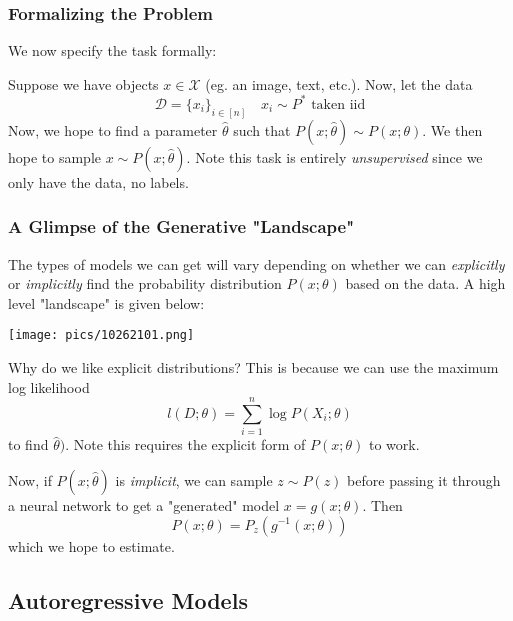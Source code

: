 \documentclass[11pt]{scrartcl}
\begin{document}
\subsubsection{Formalizing the Problem}
We now specify the task formally:

Suppose we have objects $x \in \mathcal{X}$ (eg. an image, text, etc.). Now, let the data $$\mathcal{D}=\{x_i\}_{i \in [n]} \quad x_i \sim P^* \text{ taken iid}$$
Now, we hope to find a parameter $\hat{\theta}$ such that $P(x;\hat{\theta}) \sim P(x;\theta)$. We then hope to sample $x \sim P(x;\hat{\theta})$. Note this task is entirely \textit{unsupervised} since we only have the data, no labels. 

\subsubsection{A Glimpse of the Generative "Landscape"}
The types of models we can get will vary depending on whether we can \textit{explicitly} or \textit{implicitly} find the probability distribution $P(x;\theta)$ based on the data. A high level "landscape" is given below:
\begin{center}
    \texttt{[image: pics/10262101.png]}
\end{center}
Why do we like explicit distributions? This is because we can use the maximum log likelihood $$l(D;\theta) = \sum_{i=1}^{n}\log{P(X_i;\theta)}$$ to find $\hat{\theta})$. Note this requires the explicit form of $P(x;\theta)$ to work. 

Now, if $P(x;\hat{\theta})$ is \textit{implicit}, we can sample $z \sim P(z)$ before passing it through a neural network to get a "generated" model $x = g(x;\theta)$. Then $$P(x;\theta)=P_{z}(g^{-1}(x;\theta))$$ which we hope to estimate.

\subsection{Autoregressive Models}
\end{document}
